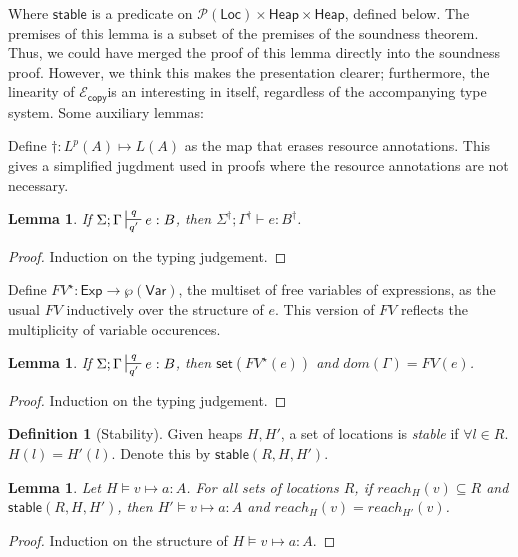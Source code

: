 \documentclass{easychair}
\newcommand{\ms}[1]{\ensuremath{\mathsf{#1}}}
\newcommand{\stable}[1]{\mathsf{stable}(#1)}
\newcommand{\set}[1]{\mathsf{set}(#1)}
\newcommand{\copySem}{\ensuremath{\mathcal{E}_{\ms{copy}}}}
\newtheorem{lemma}[theorem]{Lemma}
\theoremstyle{definition}
\newtheorem{definition}{Definition}
\begin{document}
Where $\ms{stable}$ is a predicate on $\mathcal{P}(\ms{Loc}) \times \ms{Heap} \times \ms{Heap}$, defined
below. The premises of this lemma is a subset of the premises of the soundness theorem. 
Thus, we could have
merged the proof of this lemma directly into the soundness proof. However, we think this makes the 
presentation clearer; furthermore, the linearity of \copySem is an interesting in itself, 
regardless of the accompanying type system. Some auxiliary lemmas:


Define $\dagger :  L^p(A) \mapsto L(A)$ as the map that erases resource annotations. 
This gives a simplified jugdment 
used in proofs where the resource annotations are not necessary.

\begin{lemma}
\label{a} If $\Sigma; \Gamma \sststile{q'}{q} e : B$, then $\Sigma^{\dagger}; \Gamma^{\dagger} \vdash e : B^{\dagger}$.
\end{lemma}

\begin{proof}
Induction on the typing judgement.
\end{proof}

Define $FV^{\star} : \ms{Exp} \to \wp(\ms{Var})$, the multiset of free variables of expressions,
as the usual $FV$ inductively over the structure of $e$. This version of $FV$ reflects 
the multiplicity of variable occurences.

\begin{lemma}\label{itm:linear}
If $\Sigma; \Gamma \sststile{q'}{q} e : B$, then $\set{FV^{\star}(e)}$ and $dom(\Gamma) = FV(e)$.
\end{lemma}

\begin{proof}
Induction on the typing judgement.
\end{proof}

\begin{definition}[Stability]
Given heaps $H,H'$, a set of locations is \emph{stable} if $\forall l \in R$. $H(l) = H'(l)$. Denote this by
$\stable{R,H,H'}$.
\end{definition}

\begin{lemma}
Let $H \vDash v \mapsto a : A$. For all sets of locations $R$, if $reach_H(v) \subseteq R$ and $\stable{R,H,H'}$, then $H' \vDash v \mapsto a : A$ and $reach_H(v) = reach_{H'}(v)$.
\end{lemma}

\begin{proof}
Induction on the structure of $H \vDash v \mapsto a : A$.
\end{proof}
\end{document}

